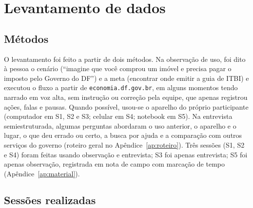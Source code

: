 \documentclass[
  12pt,
  oneside,
  a4paper,
  chapter=TITLE,
  section=TITLE,
  english,
  brazilian
]{abntex2}
\begin{document}
\chapter{Levantamento de dados}\label{cap:levantamento}

\section{Métodos}

O levantamento foi feito a partir de dois métodos. Na observação de uso, foi dito à pessoa o cenário (“imagine que você comprou
um imóvel e precisa pagar o imposto pelo Governo do DF”) e a meta (encontrar onde
emitir a guia de ITBI) e executou o fluxo a partir de
\texttt{economia.df.gov.br}, em alguns momentos tendo narrado em voz alta, sem instrução ou correção pela equipe, que apenas registrou ações, falas e pausas. Quando
possível, usou-se o aparelho do próprio participante (computador em S1, S2 e S3;
celular em S4; notebook em S5). Na entrevista semiestruturada, algumas perguntas abordaram o uso anterior, o aparelho e o lugar, o que deu errado ou certo, a busca por ajuda e a comparação com outros serviços do governo (roteiro geral no
Apêndice~\ref{ap:roteiro}). Três sessões (S1, S2 e S4) foram feitas usando observação e
entrevista; S3 foi apenas entrevista; S5 foi apenas observação, registrada em nota
de campo com marcação de tempo (Apêndice~\ref{ap:material}).

\section{Sessões realizadas}
\end{document}
